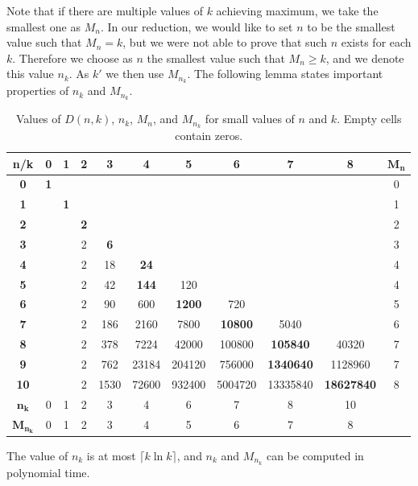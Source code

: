 Note that if there are multiple values
of $k$ achieving maximum, we take the smallest one as $M_n$.  In our
reduction, we would like to set $n$ to be the smallest value such that
$M_n=k$, but we were not able to prove that such $n$ exists for each $k$.
Therefore we choose as $n$ the smallest value such that $M_n\ge k$, and 
we denote this value $n_k$. As $k'$ we then use $M_{n_k}$. The following 
lemma states important properties of $n_k$ and $M_{n_k}$. 

\begin{table}[t]
\begin{center}
\begin{tabular}{|c||c|c|c|c|c|c|c|c|c||c|}\hline
\bf n/k&\bf 0&\bf 1&\bf 2&\bf 3&\bf 4&\bf 5&\bf 6&\bf 7&\bf 8&\bf
$\mathbf{M_n}$\\\hline\hline
\bf 0&{\bf 1}&&&&&&&&&0\\\hline
\bf 1&&\bf 1&&&&&&&&1\\\hline
\bf 2&&&\bf 2&&&&&&&2\\\hline
\bf 3&&&2&\bf 6&&&&&&3\\\hline
\bf 4&&&2&18&\bf 24&&&&&4\\\hline
\bf 5&&&2&42&\bf 144&120&&&&4\\\hline
\bf 6&&&2&90&600&\bf 1200&720&&&5\\\hline
\bf 7&&&2&186&2160&7800&\bf 10800&5040&&6\\\hline
\bf 8&&&2&378&7224&42000&100800&\bf 105840&40320&7\\\hline
\bf 9&&&2&762&23184&204120&756000&\bf 1340640&1128960&7\\\hline
\bf 10&&&2&1530&72600&932400&5004720&13335840&\bf 18627840&8\\
\hline\hline
$\mathbf{n_k}$&0&1&2&3&4&6&7&8&10&\\\hline 
$\mathbf{M_{n_k}}$&0&1&2&3&4&5&6&7&8&\\\hline 
\end{tabular}
\end{center}
\caption{Values of $D(n,k)$, $n_k$, $M_n$, and $M_{n_k}$ for small values of $n$ and $k$. Empty cells contain zeros.}\label{DNKTable}
\end{table}

\begin{lemma}\label{LEMMA:DNKlemma}
The value of $n_k$ is at most $\lceil k\ln k\rceil$, and $n_k$ and
$M_{n_k}$ can be computed in polynomial time.
\end{lemma}

